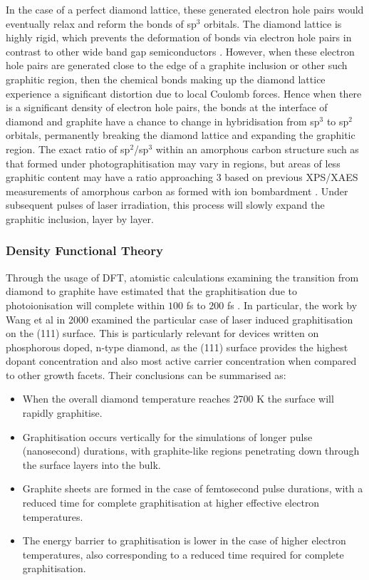 In the case of a perfect diamond lattice, these generated electron hole pairs would eventually relax and reform the  bonds of sp$^{3}$ orbitals. The diamond lattice is highly rigid, which prevents the deformation of bonds via electron hole pairs in contrast to other wide band gap semiconductors \cite{martin:1997}. However, when these electron hole pairs are generated close to the edge of a graphite inclusion or other such graphitic region, then the chemical bonds making up the diamond lattice experience a significant distortion due to local Coulomb forces. Hence when there is a significant density of electron hole pairs, the  bonds at the interface of diamond and graphite have a chance to change in hybridisation from sp$^{3}$ to sp$^{2}$ orbitals, permanently breaking the diamond lattice and expanding the graphitic region. The exact ratio of sp$^{2}$/sp$^{3}$ within an amorphous carbon structure such as that formed under photographitisation may vary in regions, but areas of less graphitic content may have a ratio approaching 3 based on previous XPS/XAES measurements of amorphous carbon as formed with ion bombardment \cite{lascovich:1991}. Under subsequent pulses of laser irradiation, this process will slowly expand the graphitic inclusion, layer by layer.

\subsubsection{Density Functional Theory}
Through the usage of DFT, atomistic calculations examining the transition from diamond to graphite have estimated that the graphitisation due to photoionisation will complete within $100$ \si{\femto\second} \cite{jeschke:1999} to $200$ \si{\femto\second} \cite{wang:2000}. In particular, the work by Wang et al in 2000 examined the particular case of laser induced graphitisation on the (111) surface. This is particularly relevant for devices written on phosphorous doped, n-type diamond, as the (111) surface provides the highest dopant concentration and also most active carrier concentration when compared to other growth facets. Their conclusions can be summarised as:

\begin{itemize}
	\item When the overall diamond temperature reaches 2700 \si{\kelvin} the surface will rapidly graphitise.
	\item Graphitisation occurs vertically for the simulations of longer pulse (nanosecond) durations, with graphite-like regions penetrating down through the surface layers into the bulk.
	\item Graphite sheets are formed in the case of femtosecond pulse durations, with a reduced time for complete graphitisation at higher effective electron temperatures.
	\item The energy barrier to graphitisation is lower in the case of higher electron temperatures, also corresponding to a reduced time required for complete graphitisation.
\end{itemize}

